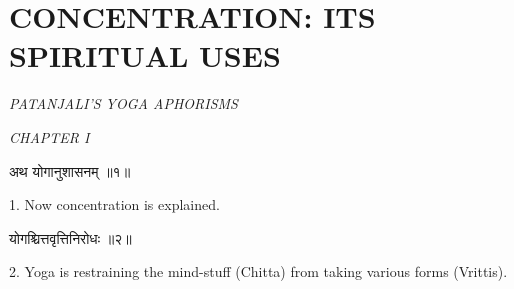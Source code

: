 \section{CONCENTRATION: ITS SPIRITUAL USES }
\begin{center}\textit{PATANJALI'S YOGA APHORISMS}\end{center}

\begin{center}\textit{CHAPTER I}\end{center}

\begin{center}
\begin{sanskrit}
अथ योगानुशासनम् ॥१॥
\end{sanskrit}
\end{center}
1. Now concentration is explained. \\

\begin{center}
\begin{sanskrit}
योगश्चित्तवृत्तिनिरोधः ॥२॥
\end{sanskrit}
\end{center}
2. Yoga is restraining the mind-stuff (Chitta) from taking
various forms (Vrittis). \\

